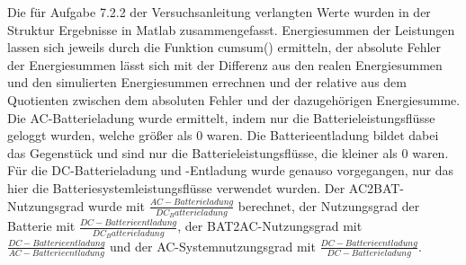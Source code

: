 Die für Aufgabe 7.2.2 der Versuchsanleitung \cite[S. 11]{Laboranleitung} verlangten Werte wurden in der Struktur Ergebnisse in Matlab zusammengefasst.
Energiesummen der Leistungen lassen sich jeweils durch die Funktion cumsum() ermitteln, der absolute Fehler der Energiesummen lässt sich mit der Differenz aus den realen Energiesummen und den simulierten Energiesummen errechnen und der relative aus dem Quotienten zwischen dem absoluten Fehler und der dazugehörigen Energiesumme.
Die AC-Batterieladung wurde ermittelt, indem nur die Batterieleistungsflüsse geloggt wurden, welche größer als 0 waren.
Die Batterieentladung bildet dabei das Gegenstück und sind nur die Batterieleistungsflüsse, die kleiner als 0 waren.
Für die DC-Batterieladung und -Entladung wurde genauso vorgegangen, nur das hier die Batteriesystemleistungsflüsse verwendet wurden.
Der AC2BAT-Nutzungsgrad wurde mit $\frac{AC-Batterieladung}{DC_Batterieladung}$ berechnet, der Nutzungsgrad der Batterie mit $\frac{DC-Batterieentladung}{DC_Batterieladung}$, der BAT2AC-Nutzungsgrad mit $\frac{DC-Batterieentladung}{AC-Batterieentladung}$ und der AC-Systemnutzungsgrad mit $\frac{DC-Batterieentladung}{DC-Batterieladung}$.
\\
